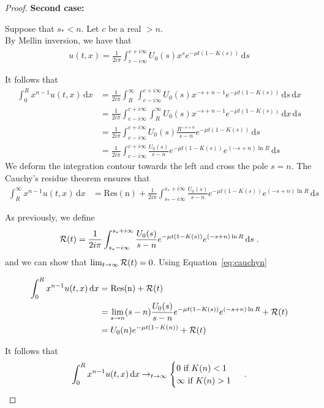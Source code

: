 \documentclass[11pt]{amsart}
\newcommand{\diff}{\,\mathrm{d}}
\begin{document}
\begin{proof}
\textbf{Second case:}

Suppose that $s_* < n$. Let $c$ be a real $>n$. \\
    By Mellin inversion, we have that
    \begin{align*}
        u(t,x) = \frac{1}{2i\pi}\int_{c-i\infty}^{c+i\infty} U_0(s) x^{s} e^{-\mu t(1 - K(s))} \diff s
    \end{align*}

It follows that
\begin{align*}
    \int_0^R x^{n-1}u(t,x) \diff x 
    &= \frac{1}{2i\pi} \int_R^{\infty} \int_{c-i\infty}^{c+i\infty} U_0(s) x^{-s+n-1} e^{-\mu t(1 - K(s))} \diff s \diff x \\
    &= \frac{1}{2i\pi} \int_{c-i\infty}^{c+i\infty} \int_R^{\infty} U_0(s) x^{-s+n-1} e^{-\mu t(1 - K(s))} \diff x \diff s \\
    &= \frac{1}{2i\pi} \int_{c-i\infty}^{c+i\infty} U_0(s) \frac{R^{-s+n}}{s-n} e^{-\mu t(1 - K(s))} \diff s \\
    &= \frac{1}{2i\pi} \int_{c-i\infty}^{c+i\infty} \frac{U_0(s)}{s-n} e^{-\mu t(1 - K(s))} e^{(-s+n)\ln R} \diff s
\end{align*}
We deform the integration contour towards the left and cross the pole $s = n$. The Cauchy's residue theorem ensures that
\begin{align}
    \int_R^{\infty} x^{n-1}u(t,x) \diff x &= \mathrm{Res(n)} + \frac{1}{2i\pi} \int_{s_*-i\infty}^{s_*+i\infty} \frac{U_0(s)}{s-n} e^{-\mu t(1 - K(s))} e^{(-s+n)\ln R} \diff s 
    \label{eq:cauchyn}
\end{align}


As previously, we define
\begin{align*}
    \Rcal(t) = \frac{1}{2i\pi} \int_{s_*-i\infty}^{s_*+i\infty} \frac{U_0(s)}{s-n} e^{-\mu t(1 - K(s))} e^{(-s+n)\ln R} \diff s
    \eqfinp
\end{align*}
and we can show that $\lim_{t\to\infty}\mathcal{R}(t) = 0$. Using Equation~\ref{eq:cauchyn}


\begin{align*}
    \int_0^R x^{n-1}u(t,x) \diff x &= \mathrm{Res(n)} + \Rcal(t) \\
    &= \lim_{s \to n} (s-n)\frac{U_0(s)}{s-n} e^{-\mu t(1 - K(s))} e^{(-s+n)\ln R}  + \Rcal(t)\\
    &= U_0(n)e^{-\mu t(1 - K(n))} + \Rcal(t)\\
\end{align*}

It follows that 
\begin{equation}
    \int_0^R x^{n-1}u(t,x) \diff x \to_{t \to \infty}
    \begin{cases}
    0 \text{ if $K(n) < 1$}\\
    \infty \text{ if $K(n) > 1$}
    \end{cases}
    \eqfinp
\end{equation}

\end{proof}
\end{document}
